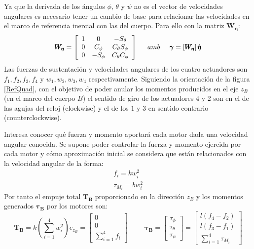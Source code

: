 \documentclass[twoside,11pt]{book}
\begin{document}
Ya que la derivada de los ángulos $\phi$, $\theta$ y $\psi$ no es el vector de velocidades angulares es necesario tener un cambio de base para relacionar las velocidades en el marco de referencia inercial con las del cuerpo. Para ello con la matriz $\pmb{W_\eta}$:
\begin{equation}
\pmb{W_\eta}=\left[\begin{array}{ccc}
1 & 0 & -S_\theta \\
0 & C_\phi & C_\theta S_\phi \\
0 & -S_\phi & C_\theta C_\phi 
\end{array} \right] \hspace{0.5cm} amb \hspace{0.5cm} 
\pmb{\gamma}=\left[ \pmb{W_\eta} \right] \pmb{\dot{\eta}} 
\end{equation}
Las fuerzas de sustentación y velocidades angulares de los cuatro actuadores son $f_1,f_2,f_3,f_4$ y $w_1,w_2,w_3,w_4$ respectivamente. Siguiendo la orientación de la figura \ref{RefQuad}, con el objetivo de poder anular los momentos producidos en el eje $z_B$ (en el marco del cuerpo $B$) el sentido de giro de los actuadores  $4$ y $2$ son en el de las agujas del reloj (clockwise) y el de los $1$ y $3$ en sentido contrario (counterclockwise).

Interesa conocer qué fuerza y momento aportará cada motor dada una velocidad angular conocida. Se supone poder controlar la fuerza y momento ejercida por cada motor y cómo aproximación inicial se considera que están relacionados con la velocidad angular de la forma:
\begin{equation}
\begin{array}{l}
f_i=kw^2_i \\ 
\tau_{M_i}=bw^2_i
\end{array}
\end{equation}
Por tanto el empuje total $\pmb{T_B}$ proporcionado en la dirección $z_B$ y los momentos generados $\pmb{\tau_B}$ por los motores son:
\begin{equation}
\pmb{T_B}=k\left(\sum_{i=1}^{4}w^2_i \right)e_{z_B}=\left[ \begin{array}{c}
0 \\
0 \\
\displaystyle\sum_{i=1}^{4}f_i
\end{array} \right] 
\hspace{1cm} \pmb{\tau_B}=\left[ \begin{array}{c}
\tau_\phi \\
\tau_\theta \\
\tau_\psi
\end{array} \right] = \left[ \begin{array}{c}
l(f_4 - f_2) \\
l(f_3 - f_1) \\
\displaystyle\sum_{i=1}^{4}\tau_{M_i}
\end{array} \right]
\end{equation}
\end{document}
